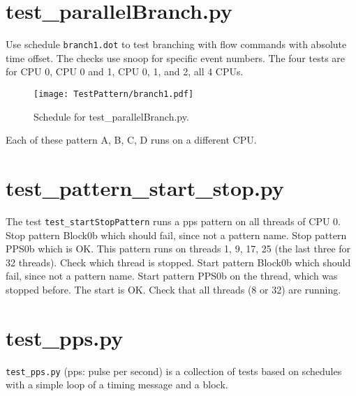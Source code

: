 \documentclass[12pt,a4paper]{report}
\begin{document}
\section{test\_parallelBranch.py}
Use schedule \texttt{branch1.dot} to test branching with flow commands
with absolute time offset. The checks use snoop for specific event numbers.
The four tests are for CPU 0, CPU 0 and 1, CPU 0, 1, and 2, all 4 CPUs.
    \begin{figure}
        \centering
        \texttt{[image: TestPattern/branch1.pdf]}
        \caption{Schedule for test\_parallelBranch.py.}
        \label{fig:Pattern_for_test_parallelBranch}
    \end{figure}
    Each of these pattern A, B, C, D runs on a different CPU.

\section{test\_pattern\_start\_stop.py}
The test \texttt{test\_startStopPattern} runs a pps pattern on all threads of CPU 0.
    Stop pattern Block0b which should fail, since not a pattern name.
    Stop pattern PPS0b which is OK. This pattern runs on threads 1, 9, 17, 25
    (the last three for 32 threads). Check which thread is stopped.
    Start pattern Block0b which should fail, since not a pattern name.
    Start pattern PPS0b on the thread, which was stopped before. The start
    is OK. Check that all threads (8 or 32) are running.

\section{test\_pps.py}
\texttt{test\_pps.py} (pps: pulse per second) is a collection of tests based
on schedules with a simple loop of a timing message and a block.
\end{document}
